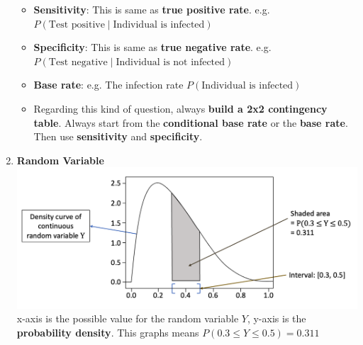 \documentclass[10pt, landscape]{article}
\begin{document}
\begin{multicols}{4}
\begin{enumerate}
\begin{itemize}
        \item \textbf{Sensitivity}: This is same as \textbf{true positive rate}. e.g. $P(\text{Test positive} \mid \text{Individual is infected})$
        \item \textbf{Specificity}: This is same as \textbf{true negative rate}. e.g. $P(\text{Test negative} \mid \text{Individual is not infected})$
        \item \textbf{Base rate}: e.g. The infection rate $P(\text{Individual is infected})$
        \item Regarding this kind of question, always \textbf{build a 2x2 contingency table}. Always start from the \textbf{conditional base rate} or the \textbf{base rate}. Then use \textbf{sensitivity} and \textbf{specificity}.
    \end{itemize}
    \item \textbf{Random Variable} \\
    \includegraphics[width=1\linewidth]{images/10.png} \\
    x-axis is the possible value for the random variable $Y$, y-axis is the \textbf{probability density}. This graphs means $P(0.3\leq Y\leq 0.5)=0.311$
\end{enumerate}

\end{multicols}
\end{document}
